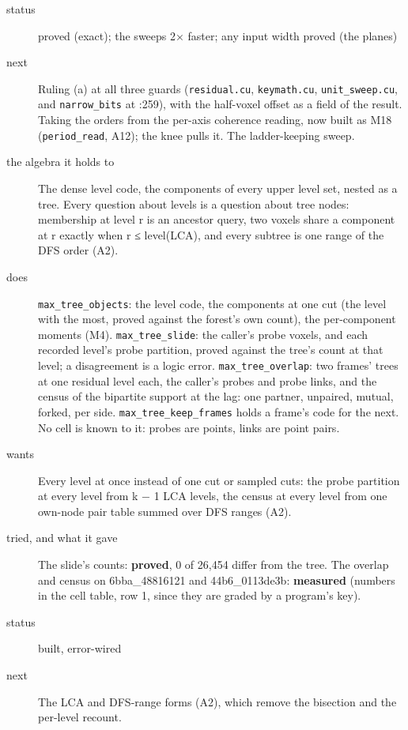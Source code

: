 \begin{description}
\item[{status}] proved (exact); the sweeps 2× faster; any input width proved (the planes)
\item[{next}] Ruling (a) at all three guards (\texttt{residual.\allowbreak{}cu}, \texttt{keymath.\allowbreak{}cu}, \texttt{unit\_\allowbreak{}sweep.\allowbreak{}cu}, and \texttt{narrow\_\allowbreak{}bits} at :259), with the half-voxel offset as a field of the result. Taking the orders from the per-axis coherence reading, now built as M18 (\texttt{period\_\allowbreak{}read}, A12); the knee pulls it. The ladder-keeping sweep.
\end{description}

\begin{description}
\item[{the algebra it holds to}] The dense level code, the components of every upper level set, nested as a tree. Every question about levels is a question about tree nodes: membership at level r is an ancestor query, two voxels share a component at r exactly when r ≤ level(LCA), and every subtree is one range of the DFS order (A2).
\item[{does}] \texttt{max\_\allowbreak{}tree\_\allowbreak{}objects}: the level code, the components at one cut (the level with the most, proved against the forest's own count), the per-component moments (M4). \texttt{max\_\allowbreak{}tree\_\allowbreak{}slide}: the caller's probe voxels, and each recorded level's probe partition, proved against the tree's count at that level; a disagreement is a logic error. \texttt{max\_\allowbreak{}tree\_\allowbreak{}overlap}: two frames' trees at one residual level each, the caller's probes and probe links, and the census of the bipartite support at the lag: one partner, unpaired, mutual, forked, per side. \texttt{max\_\allowbreak{}tree\_\allowbreak{}keep\_\allowbreak{}frames} holds a frame's code for the next. No cell is known to it: probes are points, links are point pairs.
\item[{wants}] Every level at once instead of one cut or sampled cuts: the probe partition at every level from k − 1 LCA levels, the census at every level from one own-node pair table summed over DFS ranges (A2).
\item[{tried, and what it gave}] The slide's counts: \textbf{proved}, 0 of 26,454 differ from the tree. The overlap and census on 6bba\_\allowbreak{}48816121 and 44b6\_\allowbreak{}0113de3b: \textbf{measured} (numbers in the cell table, row 1, since they are graded by a program's key).
\item[{status}] built, error-wired
\item[{next}] The LCA and DFS-range forms (A2), which remove the bisection and the per-level recount.
\end{description}

